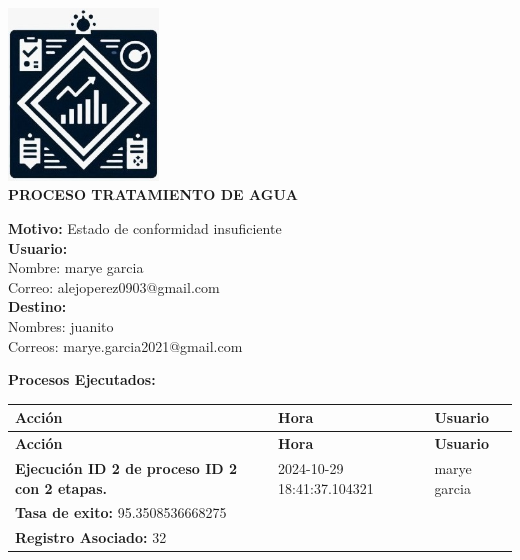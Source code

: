 \documentclass[a4paper,10pt]{article}
\begin{document}
\begin{center}
    \includegraphics[width=0.3\textwidth]{logo.jpeg} %
    \\[1em]
    {\LARGE \textbf{PROCESO TRATAMIENTO DE AGUA}}
\end{center}

\vspace{1em}

\noindent \textbf{Motivo:} Estado de conformidad insuficiente \\[0.5em]

\noindent \textbf{Usuario:} \\
Nombre: marye garcia \\
Correo: alejoperez0903@gmail.com \\[0.5em]

\noindent \textbf{Destino:} \\
Nombres: juanito \\
Correos: marye.garcia2021@gmail.com \\[0.5em]

\vspace{1.5em}

\noindent \textbf{Procesos Ejecutados:} \\
\begin{longtable}{|p{}|p{}|p{}|}
    \hline
    \textbf{Acción} & \textbf{Hora} & \textbf{Usuario} \\
    \hline
    \endfirsthead
    \hline
    \textbf{Acción} & \textbf{Hora} & \textbf{Usuario} \\
    \hline
    \endhead
    \hline
    \endfoot
 \textbf{Ejecución ID 2 de proceso ID 2 con 2 etapas.} &  2024-10-29 18:41:37.104321 &  marye garcia \\ 
 \textbf{Tasa de exito:} 95.3508536668275 & & \\ 
 \textbf{Registro Asociado:} 32 & & \\ 
 \hline 

\end{longtable}
\end{document}
